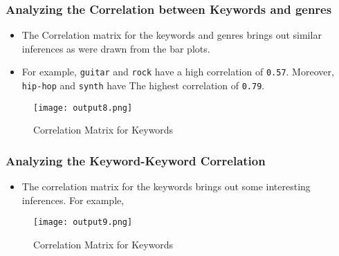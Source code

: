 \documentclass{article}
\begin{document}
\subsubsection{Analyzing the Correlation between Keywords and genres}
\begin{itemize}
    \item The Correlation matrix for the keywords and genres brings out similar inferences as were drawn from the bar plots.
    \item For example, \texttt{guitar} and \texttt{rock} have a high correlation of \texttt{0.57}. Moreover, \texttt{hip-hop} and \texttt{synth} have The highest correlation of \texttt{0.79}.
\end{itemize}
\begin{figure}[h]
    \centering
    \texttt{[image: output8.png]}
    \caption{Correlation Matrix for Keywords}
    \label{fig:correlation_matrix}
\end{figure}

\subsubsection{Analyzing the Keyword-Keyword Correlation}
\begin{itemize}
    \item The correlation matrix for the keywords brings out some interesting inferences. For example, 
\end{itemize}
\begin{figure}[h]
    \centering
    \texttt{[image: output9.png]}
    \caption{Correlation Matrix for Keywords}
    \label{fig:correlation_matrix_keywords}
\end{figure}



\end{document}

